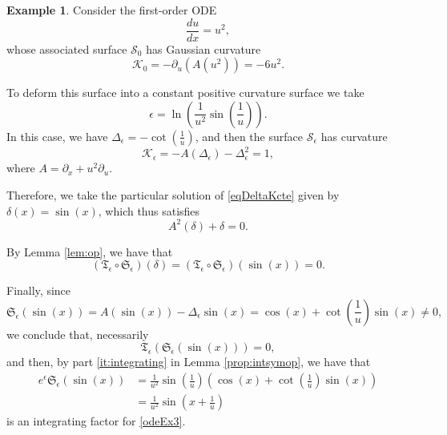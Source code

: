 \documentclass{article}
\theoremstyle{remark}
\theoremstyle{definition}
\newtheorem{example}[remark]{Example}
\begin{document}
\begin{example}\label{ex:defpos}
Consider the first-order ODE
\begin{equation}\label{odeEx3}
    \dfrac{du}{dx}=u^2,
\end{equation}
whose associated surface $\mathcal{S}_0$ has Gaussian curvature
$$
\mathcal{K}_0=-\partial_u(A(u^2))=-6u^2.
$$

To deform this surface into a constant positive curvature surface we take
$$
\epsilon=\ln\left(\frac{1}{u^2} \sin\left(\frac{1}{u}\right)\right).
$$
In this case, we have $\Delta_{\epsilon}=-\cot\left(\frac{1}{u}\right)$, and then the surface $\mathcal{S}_{\epsilon}$ has curvature
$$
\mathcal{K}_{\epsilon}=-A(\Delta_{\epsilon})-\Delta_{\epsilon}^2=1,
$$
where $A=\partial_x+u^2 \partial_u$.

Therefore, we take the particular solution of \eqref{eqDeltaKcte} given by $\delta(x)=\sin\left(x\right)$, which thus satisfies
$$
A^2(\delta)+\delta=0.
$$

By Lemma \ref{lem:op}, we have that
$$
\left(\mathfrak{T}_{\epsilon}\circ \mathfrak{S}_{\epsilon} \right)(\delta)=\left(\mathfrak{T}_{\epsilon}\circ \mathfrak{S}_{\epsilon} \right)(\sin(x))=0.
$$
 
Finally, since
$$
\mathfrak{S}_{\epsilon} (\sin(x))=A(\sin(x))-\Delta_{\epsilon} \sin(x)=\cos(x)+\cot\left(\frac{1}{u}\right)\sin(x)\neq 0,
$$
we conclude that, necessarily
$$
\mathfrak{T}_{\epsilon}(\mathfrak{S}_{\epsilon} (\sin(x)))=0,
$$
and then, by part \ref{it:integrating} in Lemma \ref{prop:intsymop}, we have that
$$
\begin{aligned}
e^{\epsilon} \mathfrak{S}_{\epsilon} (\sin(x))&=\frac{1}{u^2} \sin\left(\frac{1}{u}\right)\left(\cos(x)+\cot\left(\frac{1}{u}\right)\sin(x)\right)\\
                                        &=\frac{1}{u^2} \sin\left(x+\frac{1}{u}\right)
\end{aligned}
$$
is an integrating factor for \eqref{odeEx3}.
\end{example}
\end{document}
